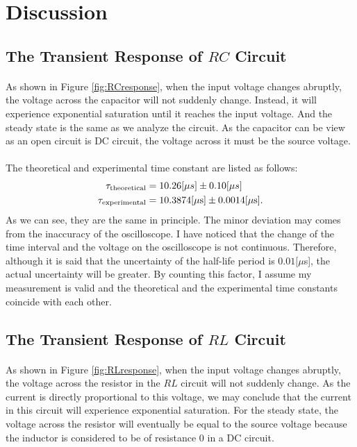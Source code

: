 \documentclass{my_template}
\begin{document}
    \section{Discussion}
    \subsection{The Transient Response of $RC$ Circuit}
    \paragraph{} As shown in Figure \ref{fig:RCresponse}, when the input voltage changes abruptly, the voltage across the capacitor will not suddenly change. Instead, it will experience exponential saturation until it reaches the input voltage. And the steady state is the same as we analyze the circuit. As the capacitor can be view as an open circuit is DC circuit, the voltage across it must be the source voltage.
    \vspace{-5mm} 
    \paragraph{} The theoretical and experimental time constant are listed as follows:
    \begin{eqnarray*}
        \tau_{\rm theoretical}&=10.26[\mu s]\pm 0.10[\mu s]\\
        \tau_{\rm experimental}&=10.3874[\mu \rm s]\pm 0.0014[\mu s].
    \end{eqnarray*}
    As we can see, they are the same in principle. The minor deviation may comes from the inaccuracy of the oscilloscope. I have noticed that the change of the time interval and the voltage on the oscilloscope is not continuous. Therefore, although it is said that the uncertainty of the half-life period is $0.01[\mu$s], the actual uncertainty will be greater. By counting this factor, I assume my measurement is valid and the theoretical and the experimental time constants coincide with each other. 
    \subsection{The Transient Response of $RL$ Circuit}
    \paragraph{} As shown in Figure \ref{fig:RLresponse}, when the input voltage changes abruptly, the voltage across the resistor in the $RL$ circuit will not suddenly change. As the current is directly proportional to this voltage, we may conclude that the current in this circuit will experience exponential saturation. For the steady state, the voltage across the resistor will eventually be equal to the source voltage because the inductor is considered to be of resistance 0 in a DC circuit. 
    \vspace{-5mm}
\end{document}
